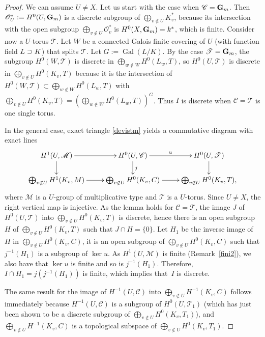 \documentclass[10pt,a4paper]{amsart}
\let\mathcal\mathscr
\theoremstyle{plain}
\theoremstyle{definition}
\DeclareMathOperator \gal {Gal}
\newcommand\cO {\mathcal{O}}
\newcommand \cT {\mathcal{T}}
\newcommand \cC {\mathcal{C}}
\begin{document}
\begin{proof} We can assume $U \neq X$. Let us start with the case
when $\cC=\G$.
Then $\cO_U ^*:=H^0(U,\G)$ is a discrete subgroup of $\bigoplus
_{v \not \in U} K_v^*$, because its intersection with the open subgroup
$\bigoplus_{v \not \in U} \cO_v^*$ is $H^0(X,\mathbf{G}_m)=k^*$, which is finite.
Consider now a $U$\nobreakdash-torus $\cT$. Let $W$ be a connected Galois
finite covering of $U$ (with function field $L \supset\nobreak K$)
that splits $\cT$. Let $G:=\gal(L/K)$.
By the case $\cT=\G$, the subgroup $H^0(W,\cT)$ is discrete
in $\bigoplus_{w \not \in W} H^0(L_w,T)$, so $H^0(U,\cT)$ is discrete
in $\bigoplus_{v \not \in U} H^0(K_v,T)$ because it is the intersection
of $H^0(W,\cT) \subset \bigoplus_{w \not \in W} H^0(L_w,T)$ with
$\bigoplus_{v \not \in U} H^0(K_v,T)=(\bigoplus_{w \not \in W} H^0(L_w,T))^G$.
Thus $I$ is discrete when $\cC=\cT$ is one single torus.

In the general case, exact triangle \eqref{devistm} yields a commutative
diagram with exact lines\vspace*{-8pt}
\[
\xymatrix@R=6mm{
H^1(U,\mathcal M) \ar[r]\ar[d]& H^0(U,\cC)\ar[r]^-u\ar[d]^j& H^0(U,\cT)\ar[d]\\
\bigoplus_{v \not \in U} H^1(K_v,M) \ar[r]& \bigoplus_{v \not \in U}
H^0(K_v,C) \ar[r]& \bigoplus_{v \not \in U} H^0(K_v,T),
}
\]
where $\mathcal M$ is a $U$-group of multiplicative type and $\cT$
is a $U$-torus. Since $U \neq X$, the right vertical map
is injective. As the lemma holds for $\cC=\cT$,
the image $J$ of $H^0(U,\cT)$ into
$\bigoplus_{v \not \in U} H^0(K_v,T)$ is discrete,
hence there is an open subgroup $H$ of $\bigoplus_{v \not \in U} H^0(K_v,T)$
such that $J \cap H=\{0\}$. Let $H_1$ be the inverse image of $H$ in
$\bigoplus_{v \not \in U} H^0(K_v,C)$, it is an open subgroup of
$\bigoplus_{v \not \in U} H^0(K_v,C)$ such
that $j^{-1}(H_1)$ is a subgroup of $\ker u$. As
$H^1(U,\mathcal M)$ is finite (Remark~\ref{fini2}), we also have that
$\ker u$ is finite and so is $j^{-1}(H_1)$. Therefore, $I \cap H_1
=j(j^{-1}(H_1))$ is finite, which implies that~$I$ is discrete.

The same result for the image of $H^{-1}(U,\cC)$ into $\bigoplus_{v \not \in U}
H^{-1}(K_v,C)$ follows immediately because $H^{-1}(U,\cC)$ is a subgroup
of $H^0(U,\cT_1)$ (which has just been shown to be a discrete subgroup
of $\bigoplus_{v \not \in U} H^0(K_v,T_1)$), and $\bigoplus_{v \not \in U}
H^{-1}(K_v,C)$ is a topological subspace of
$\bigoplus_{v \not \in U} H^0(K_v,T_1)$.
\end{proof}
\end{document}
